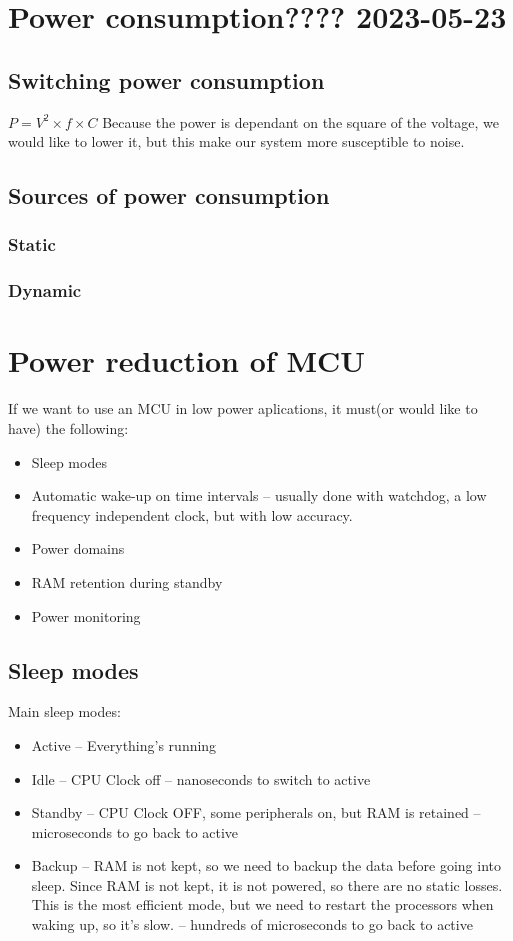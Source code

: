 \chapter{Power consumption???? 2023-05-23}

\section{Switching power consumption}

\nt
{
    $P = V^{2}\times f \times C$
}
Because the power is dependant on the square of the voltage, we would like to lower it, but this make our system more susceptible to noise.

\section
{
    Sources of power consumption
}
\subsection{Static}

\subsection{Dynamic}


\chapter{Power reduction of MCU}
If we want to use an MCU in low power aplications, it must(or would like to have) the following:

\begin{itemize}
        \item Sleep modes
        \item Automatic wake-up on time intervals -- usually done with watchdog, a low frequency independent clock, but with low accuracy.
        \item Power domains
        \item RAM retention during standby
        \item Power monitoring
\end{itemize}

\section{Sleep modes}
Main sleep modes:
\begin{itemize}
        \item Active -- Everything's running
        \item Idle -- CPU Clock off -- nanoseconds to switch to active
        \item Standby -- CPU Clock OFF, some peripherals on, but RAM is retained -- microseconds to go back to active
        \item Backup -- RAM is not kept, so we need to backup the data before going into sleep. Since RAM is not kept,
            it is not powered, so there are no static losses. This is the most efficient mode, but we need to restart
            the processors when waking up, so it's slow. -- hundreds of microseconds to go back to active
\end{itemize}
